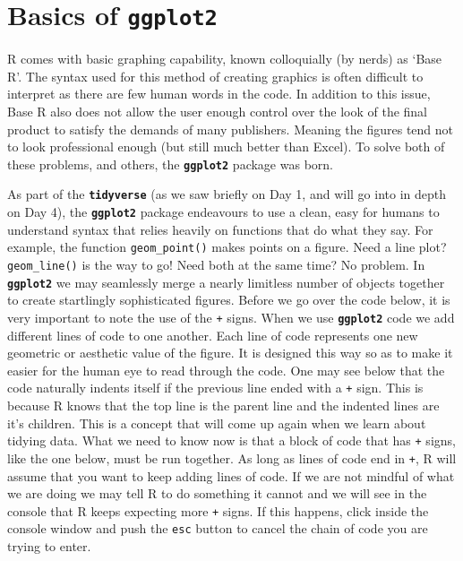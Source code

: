 \documentclass[]{book}
\theoremstyle{definition}
\theoremstyle{definition}
\theoremstyle{definition}
\theoremstyle{remark}
\begin{document}
\section{\texorpdfstring{Basics of
\textbf{\texttt{ggplot2}}}{Basics of ggplot2}}\label{basics-of-ggplot2}

R comes with basic graphing capability, known colloquially (by nerds) as
`Base R'. The syntax used for this method of creating graphics is often
difficult to interpret as there are few human words in the code. In
addition to this issue, Base R also does not allow the user enough
control over the look of the final product to satisfy the demands of
many publishers. Meaning the figures tend not to look professional
enough (but still much better than Excel). To solve both of these
problems, and others, the \textbf{\texttt{ggplot2}} package was born.

As part of the \textbf{\texttt{tidyverse}} (as we saw briefly on Day 1,
and will go into in depth on Day 4), the \textbf{\texttt{ggplot2}}
package endeavours to use a clean, easy for humans to understand syntax
that relies heavily on functions that do what they say. For example, the
function \texttt{geom\_point()} makes points on a figure. Need a line
plot? \texttt{geom\_line()} is the way to go! Need both at the same
time? No problem. In \textbf{\texttt{ggplot2}} we may seamlessly merge a
nearly limitless number of objects together to create startlingly
sophisticated figures. Before we go over the code below, it is very
important to note the use of the \texttt{+} signs. When we use
\textbf{\texttt{ggplot2}} code we add different lines of code to one
another. Each line of code represents one new geometric or aesthetic
value of the figure. It is designed this way so as to make it easier for
the human eye to read through the code. One may see below that the code
naturally indents itself if the previous line ended with a \texttt{+}
sign. This is because R knows that the top line is the parent line and
the indented lines are it's children. This is a concept that will come
up again when we learn about tidying data. What we need to know now is
that a block of code that has \texttt{+} signs, like the one below, must
be run together. As long as lines of code end in \texttt{+}, R will
assume that you want to keep adding lines of code. If we are not mindful
of what we are doing we may tell R to do something it cannot and we will
see in the console that R keeps expecting more \texttt{+} signs. If this
happens, click inside the console window and push the \texttt{esc}
button to cancel the chain of code you are trying to enter.
\end{document}
